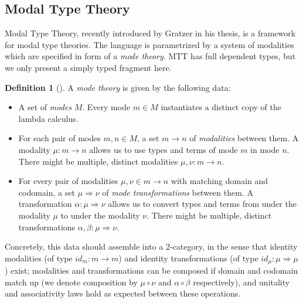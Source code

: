 \documentclass{scrartcl}
\theoremstyle{definition}
\newtheorem{definition}{Definition}
\theoremstyle{plain}
\begin{document}
\subsection{Modal Type Theory}
Modal Type Theory\cite{gratzer2023syntax}, recently introduced by Gratzer in his
thesis, is a framework for modal type theories. The
language is parametrized by a system of modalities which are specified in form
of a \textit{mode theory}.
MTT has full dependent types, but we only present a simply typed fragment here.%
\begin{definition}[{\cite[Chapter 6.1.1]{gratzer2023syntax}}]
  A \textit{mode theory} is given by the following data:
  \begin{itemize}
  \item A set of \textit{modes} $M$. Every mode $m \in M$ instantiates a
    distinct copy of the lambda calculus.
    \item For each pair of modes $m, n \in M$, a set $m \to n$ of \textit{modalities}
      between them. A modality $\mu : m \to n$ allows us to use types and terms
      of mode $m$ in mode $n$. There might be multiple, distinct modalities $\mu , \nu : m
      \to n$.
    \item For every pair of modalities $\mu, \nu \in m \to n$ with matching domain
      and codomain, a set $\mu \Rightarrow \nu$ of \textit{mode transformations} between them.
      A transformation $\alpha : \mu \Rightarrow \nu$ allows us to convert
      types and terms from under the modality $\mu$ to under the modality $\nu$.
      There might be multiple, distinct transformations $\alpha, \beta : \mu
      \Rightarrow \nu$.
  \end{itemize}
  Concretely, this data should assemble into a 2-category, in the sense that
  identity modalities (of type $id_m : m \to m$) and identity transformations (of
  type $id_\mu : \mu \Rightarrow \mu $) exist; modalities and transformations can
  be composed if domain and codomain match up (we denote composition by $\mu \circ
  \nu$ and $\alpha \circ \beta$ respectively), and unitality and associativity
  laws hold as expected between these operations\cite{licata2016adjoint}.
\end{definition}%
\end{document}

